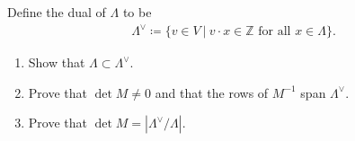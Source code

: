 Define the dual of \(\Lambda\) to be
\begin{align*}
\Lambda ^\vee\coloneqq\{v \in V {~\mathrel{\Big|}~}v \cdot x \in {\mathbb{Z}}\text{ for all } x \in \Lambda
\}
.\end{align*}

\begin{enumerate}
\def\labelenumi{\alph{enumi}.}
\item
  Show that \(\Lambda \subset \Lambda ^\vee\).
\item
  Prove that \(\det M \neq 0\) and that the rows of \(M^{-1}\) span
  \(\Lambda^\vee\).
\item
  Prove that \(\det M = |\Lambda^\vee/\Lambda|\).
\end{enumerate}


